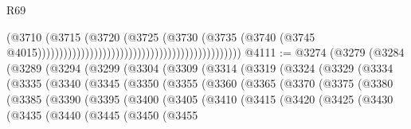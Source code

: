\begin{lexlean}{R69}
\begin{coremodule}
{                                                                                  (@3710
                                                                                    (@3715
                                                                                      (@3720
                                                                                        (@3725
                                                                                          (@3730
                                                                                            (@3735
                                                                                              (@3740
                                                                                                (@3745
                                                                                                  @4015)))))))))))))))))))))))))))))))))))))))))))))))
@4111 := @3274
    (@3279
      (@3284
        (@3289
          (@3294
            (@3299
              (@3304
                (@3309
                  (@3314
                    (@3319
                      (@3324
                        (@3329
                          (@3334
                            (@3335
                              (@3340
                                (@3345
                                  (@3350
                                    (@3355
                                      (@3360
                                        (@3365
                                          (@3370
                                            (@3375
                                              (@3380
                                                (@3385
                                                  (@3390
                                                    (@3395
                                                      (@3400
                                                        (@3405
                                                          (@3410
                                                            (@3415
                                                              (@3420
                                                                (@3425
                                                                  (@3430
                                                                    (@3435
                                                                      (@3440
                                                                        (@3445
                                                                          (@3450
                                                                            (@3455
}
\end{coremodule}
\end{lexlean}
